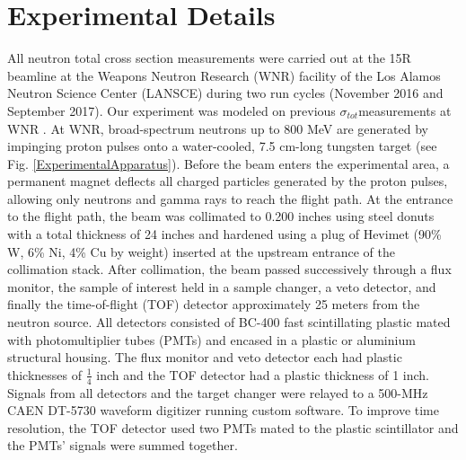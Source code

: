 \documentclass[twocolumn,secnumarabic,amssymb, nobibnotes, aps, prl,
superscriptaddress, nobalancelastpage]{revtex4}
\newcommand{\tot}{\ensuremath{\sigma_{tot}}}
\begin{document}
\section{Experimental Details}
All neutron total cross section measurements were carried out at the 15R
beamline at the Weapons Neutron Research (WNR) facility of the Los Alamos
Neutron Science Center (LANSCE) during two run cycles (November 2016 and
September 2017). Our experiment was modeled on previous
\tot measurements at WNR \cite{Finlay1993,Abfalterer2001,Shane2010}. At WNR,
broad-spectrum neutrons up
to 800 MeV are generated by impinging proton pulses onto a water-cooled, 7.5
cm-long tungsten target (see Fig. \ref{ExperimentalApparatus}). Before the beam
enters the experimental area, a
permanent magnet deflects all charged particles generated by the proton pulses, 
allowing only neutrons and gamma rays to reach the flight path. At the
entrance to the flight path, the beam was collimated to 0.200 inches using steel
donuts with a total thickness of 24 inches and hardened using a plug of Hevimet (90\% W, 6\% 
Ni, 4\% Cu by weight) inserted at the upstream entrance of the
collimation stack. After collimation, the beam passed successively through a flux 
monitor, the sample of interest held in a sample changer, a veto detector, and finally the 
time-of-flight (TOF) detector approximately 25 meters from the neutron source.
All detectors consisted of BC-400 fast scintillating plastic mated with 
photomultiplier tubes (PMTs) and encased in a plastic or
aluminium structural housing. The flux monitor and veto detector each had
plastic thicknesses of $\frac{1}{4}$ inch and the TOF detector had a plastic
thickness of 1 inch. Signals from all detectors and
the target changer were relayed to a 500-MHz CAEN DT-5730 waveform digitizer
running custom software. To improve time resolution, the TOF detector used two
PMTs mated to the plastic scintillator and the PMTs' signals were summed
together.
\end{document}
